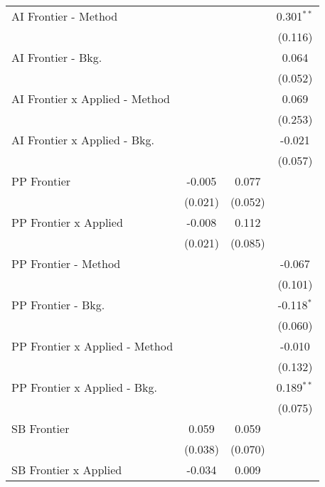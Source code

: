 \begin{tabular}{lccc}
   AI Frontier - Method           &             &              & 0.301$^{**}$\\   
                                  &             &              & (0.116)\\   
   AI Frontier - Bkg.             &             &              & 0.064\\   
                                  &             &              & (0.052)\\   
   AI Frontier x Applied - Method &             &              & 0.069\\   
                                  &             &              & (0.253)\\   
   AI Frontier x Applied - Bkg.   &             &              & -0.021\\   
                                  &             &              & (0.057)\\   
   PP Frontier                    & -0.005      & 0.077        &   \\   
                                  & (0.021)     & (0.052)      &   \\   
   PP Frontier x Applied          & -0.008      & 0.112        &   \\   
                                  & (0.021)     & (0.085)      &   \\   
   PP Frontier - Method           &             &              & -0.067\\   
                                  &             &              & (0.101)\\   
   PP Frontier - Bkg.             &             &              & -0.118$^{*}$\\   
                                  &             &              & (0.060)\\   
   PP Frontier x Applied - Method &             &              & -0.010\\   
                                  &             &              & (0.132)\\   
   PP Frontier x Applied - Bkg.   &             &              & 0.189$^{**}$\\   
                                  &             &              & (0.075)\\   
   SB Frontier                    & 0.059       & 0.059        &   \\   
                                  & (0.038)     & (0.070)      &   \\   
   SB Frontier x Applied          & -0.034      & 0.009        &   \\   

\end{tabular}
